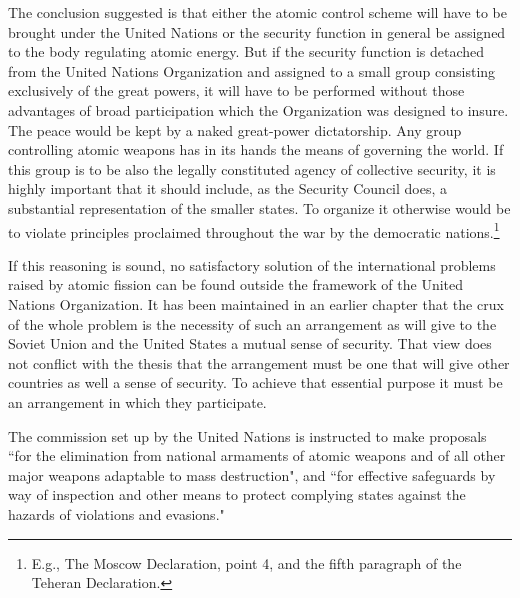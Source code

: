 The conclusion suggested is that either the atomic control scheme will have to be brought under the United Nations or the security function in general be assigned to the body regulating atomic energy. But if the security function is detached from the United Nations Organization and assigned to a small group consisting exclusively of the great powers, it will have to be performed without those advantages of broad participation which the Organization was designed to insure. The peace would be kept by a naked great-power dictatorship. Any group controlling atomic weapons has in its hands the means of governing the world. If this group is to be also the legally constituted agency of collective security, it is highly important that it should include, as the Security Council does, a substantial representation of the smaller states. To organize it otherwise would be to violate principles proclaimed throughout the war by the democratic nations.\footnote{E.g., The Moscow Declaration, point 4, and the fifth paragraph of the Teheran Declaration.}

If this reasoning is sound, no satisfactory solution of the international problems raised by atomic fission can be found outside the framework of the United Nations Organization. It has been maintained in an earlier chapter that the crux of the whole problem is the necessity of such an arrangement as will give to the Soviet Union and the United States a mutual sense of security. That view does not conflict with the thesis that the arrangement must be one that will give other countries as well a sense of security. To achieve that essential purpose it must be an arrangement in which they participate.

The commission set up by the United Nations is instructed to make proposals ``for the elimination from national armaments of atomic weapons and of all other major weapons adaptable to mass destruction", and ``for effective safeguards by way of inspection and other means to protect complying states against the hazards of violations and evasions."

